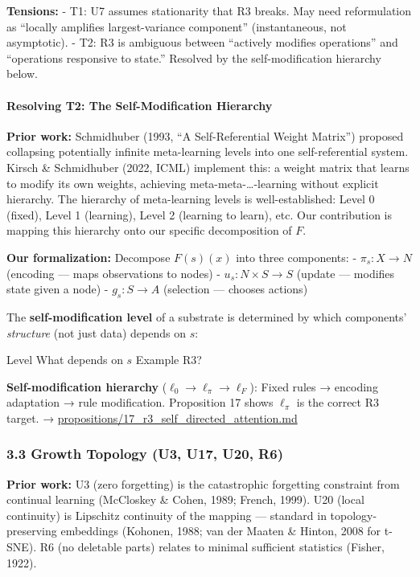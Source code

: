 \documentclass[
  11pt,
]{article}
\begin{document}
\textbf{Tensions:} - T1: U7 assumes stationarity that R3 breaks. May
need reformulation as ``locally amplifies largest-variance component''
(instantaneous, not asymptotic). - T2: R3 is ambiguous between
``actively modifies operations'' and ``operations responsive to state.''
Resolved by the self-modification hierarchy below.

\paragraph{Resolving T2: The Self-Modification
Hierarchy}\label{resolving-t2-the-self-modification-hierarchy}

\textbf{Prior work:} Schmidhuber (1993, ``A Self-Referential Weight
Matrix'') proposed collapsing potentially infinite meta-learning levels
into one self-referential system. Kirsch \& Schmidhuber (2022, ICML)
implement this: a weight matrix that learns to modify its own weights,
achieving meta-meta-\ldots-learning without explicit hierarchy. The
hierarchy of meta-learning levels is well-established: Level 0 (fixed),
Level 1 (learning), Level 2 (learning to learn), etc. Our contribution
is mapping this hierarchy onto our specific decomposition of \(F\).

\textbf{Our formalization:} Decompose \(F(s)(x)\) into three components:
- \(\pi_s: X \to N\) (encoding --- maps observations to nodes) -
\(u_s: N \times S \to S\) (update --- modifies state given a node) -
\(g_s: S \to A\) (selection --- chooses actions)

The \textbf{self-modification level} of a substrate is determined by
which components' \emph{structure} (not just data) depends on \(s\):

Level \textbar{} What depends on \(s\) \textbar{} Example \textbar{} R3?
\textbar{}

\textbf{Self-modification hierarchy}
(\(\ell_0 \to \ell_\pi \to \ell_F\)): Fixed rules → encoding adaptation
→ rule modification. Proposition 17 shows \(\ell_\pi\) is the correct R3
target. → \url{propositions/17_r3_self_directed_attention.md}

\subsubsection{3.3 Growth Topology (U3, U17, U20,
R6)}\label{growth-topology-u3-u17-u20-r6}

\textbf{Prior work:} U3 (zero forgetting) is the catastrophic forgetting
constraint from continual learning (McCloskey \& Cohen, 1989; French,
1999). U20 (local continuity) is Lipschitz continuity of the mapping ---
standard in topology-preserving embeddings (Kohonen, 1988; van der
Maaten \& Hinton, 2008 for t-SNE). R6 (no deletable parts) relates to
minimal sufficient statistics (Fisher, 1922).
\end{document}
